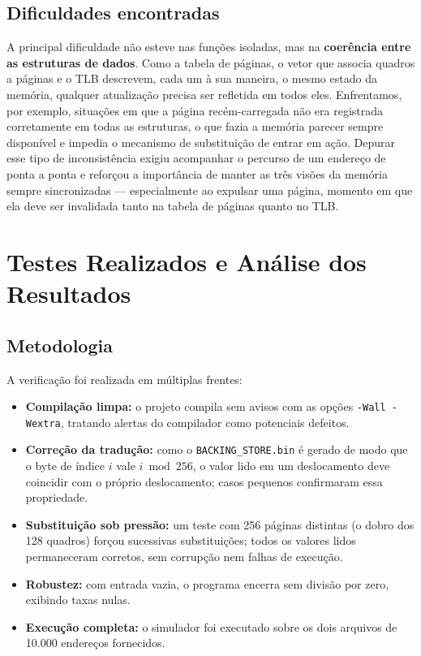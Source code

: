\documentclass[11pt,a4paper]{article}
\begin{document}
\subsection{Dificuldades encontradas}
A principal dificuldade não esteve nas funções isoladas, mas na \textbf{coerência
entre as estruturas de dados}. Como a tabela de páginas, o vetor que associa
quadros a páginas e o TLB descrevem, cada um à sua maneira, o mesmo estado da
memória, qualquer atualização precisa ser refletida em todos eles. Enfrentamos,
por exemplo, situações em que a página recém-carregada não era registrada
corretamente em todas as estruturas, o que fazia a memória parecer sempre
disponível e impedia o mecanismo de substituição de entrar em ação. Depurar esse
tipo de inconsistência exigiu acompanhar o percurso de um endereço de ponta a
ponta e reforçou a importância de manter as três visões da memória sempre
sincronizadas --- especialmente ao expulsar uma página, momento em que ela deve
ser invalidada tanto na tabela de páginas quanto no TLB.

\section{Testes Realizados e Análise dos Resultados}
\label{sec:resultados}

\subsection{Metodologia}
A verificação foi realizada em múltiplas frentes:
\begin{itemize}
    \item \textbf{Compilação limpa:} o projeto compila sem avisos com as opções
          \texttt{-Wall -Wextra}, tratando alertas do compilador como potenciais
          defeitos.
    \item \textbf{Correção da tradução:} como o \texttt{BACKING\_STORE.bin} é
          gerado de modo que o byte de índice $i$ vale $i \bmod 256$, o valor
          lido em um deslocamento deve coincidir com o próprio deslocamento;
          casos pequenos confirmaram essa propriedade.
    \item \textbf{Substituição sob pressão:} um teste com 256 páginas distintas
          (o dobro dos 128 quadros) forçou sucessivas substituições; todos os
          valores lidos permaneceram corretos, sem corrupção nem falhas de
          execução.
    \item \textbf{Robustez:} com entrada vazia, o programa encerra sem divisão
          por zero, exibindo taxas nulas.
    \item \textbf{Execução completa:} o simulador foi executado sobre os dois
          arquivos de 10.000 endereços fornecidos.
\end{itemize}
\end{document}
